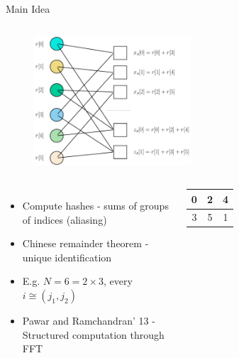 \documentclass[10pt,xcolor=table]{beamer}
\begin{document}
\begin{frame}{Main Idea}
\begin{columns}
	\begin{figure}[t]
		\centering
		\includegraphics[width=2.3in]{Factorgraph_example}
	\end{figure}
	\begin{figure}
		\centering
		\scalebox{0.23}{}
	\end{figure}
	
\end{columns}
\begin{columns}
	\begin{itemize}
		\item Compute hashes - sums of groups of indices (aliasing)
		\item Chinese remainder theorem - unique identification
		\item E.g. $N = 6 = 2 \times 3$, every $i \cong (j_1,j_2)$
		\item Pawar and Ramchandran' 13 - Structured computation through FFT
	\end{itemize}
	\begin{tabular}{|c|c|c|}
		\hline
		0 & 2 & 4 \\
		\hline
		3 & 5 & 1 \\
		\hline
	\end{tabular}
\end{columns}
\end{frame}
\end{document}
